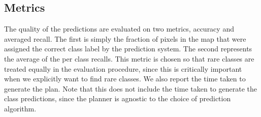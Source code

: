 \subsection{Metrics}
The quality of the predictions are evaluated on two metrics, accuracy and averaged recall. The first is simply the fraction of pixels in the map that were assigned the correct class label by the prediction system. The second represents the average of the per class recalls. This metric is chosen so that rare classes are treated equally in the evaluation procedure, since this is critically important when we explicitly want to find rare classes. We also report the time taken to generate the plan. Note that this does not include the time taken to generate the class predictions, since the planner is agnostic to the choice of prediction algorithm.

 
